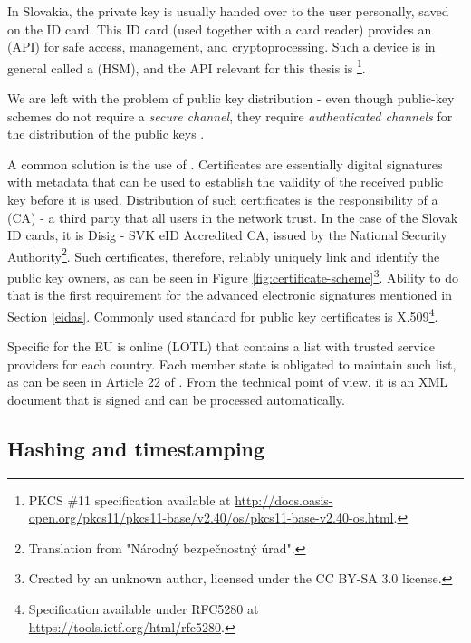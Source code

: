 \documentclass[thesismargins, english, thesislinespacing, onelinechapterstyle, upjsfrontpage]{rnthesis}
\begin{document}
In Slovakia, the private key is usually handed over to the user personally, saved on the ID card. This ID card (used together with a card reader) provides an  (API) for safe access, management, and cryptoprocessing.
Such a device is in general called a  (HSM), and the API relevant for this thesis is  \footnote{PKCS \#11 specification available at \url{http://docs.oasis-open.org/pkcs11/pkcs11-base/v2.40/os/pkcs11-base-v2.40-os.html}.}.

We are left with the problem of public key distribution - even though public-key schemes do not require a \textit{secure channel}, they require \textit{authenticated channels} for the distribution of the public keys \cite{cryptotxtbook}.

A common solution is the use of .
Certificates are essentially digital signatures with metadata that can be used to establish the validity of the received public key before it is used.
Distribution of such certificates is the responsibility of a  (CA) - a third party that all users in the network trust.
In the case of the Slovak ID cards, it is Disig - SVK eID Accredited CA, issued by the National Security Authority\footnote{Translation from "Národný bezpečnostný úrad".}.
Such certificates, therefore, reliably uniquely link and identify the public key owners, as can be seen in Figure \ref{fig:certificate-scheme}\footnote{Created by an unknown author, licensed under the CC BY-SA 3.0 license.}.
Ability to do that is the first requirement for the advanced electronic signatures mentioned in Section \ref{eidas}.
Commonly used standard for public key certificates is X.509\footnote{Specification available under RFC5280 at \url{https://tools.ietf.org/html/rfc5280}.}.


Specific for the EU is online  (LOTL) that contains a list with trusted service providers for each country.
Each member state is obligated to maintain such list, as can be seen in Article 22 of \cite{eidas}.
From the technical point of view, it is an XML document that is signed and can be processed automatically.

\subsection{Hashing and timestamping}
\end{document}
